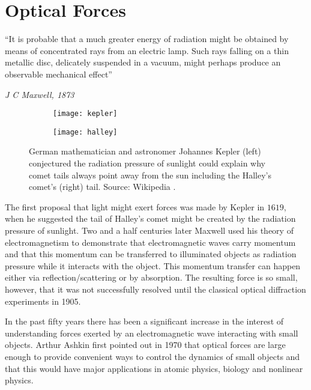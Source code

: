 \section{Optical Forces}

\setlength{\epigraphwidth}{0.8\textwidth}
\epigraph{``It is probable that a much greater energy of radiation might be obtained by means of concentrated rays from an electric lamp. Such rays falling on a thin metallic disc, delicately suspended in a vacuum, might perhaps produce an observable mechanical effect''}{\textit{J C Maxwell, 1873}}

\begin{figure}
\begin{subfigure}{.4\textwidth}
  \centering
  \texttt{[image: kepler]}
  \label{fig:kepler}
\end{subfigure}%
\begin{subfigure}{.4\textwidth}
  \centering
  \texttt{[image: halley]}
  \label{fig:halley}
\end{subfigure}
\caption{German mathematician and astronomer Johannes Kepler (left) conjectured the radiation pressure of sunlight could explain why comet tails always point away from the sun including the Halley's comet's (right) tail. Source: Wikipedia \cite{kepler_pic, halley_comet}.}
\label{fig:kepler_halley}
\end{figure}

The first proposal that light might exert forces was made by Kepler in $1619$, when he suggested the tail of Halley's comet might be created by the radiation pressure of sunlight. Two and a half centuries later Maxwell used his theory of electromagnetism to demonstrate that electromagnetic waves carry momentum and that this momentum can be transferred to illuminated objects as radiation pressure while it interacts with the object. This momentum transfer can happen either via reflection/scattering or by absorption. The resulting force is so small, however, that it was not successfully resolved until the classical optical diffraction experiments in 1905.

In the past fifty years there has been a significant increase in the interest of understanding forces exerted by an electromagnetic wave interacting with small objects. Arthur Ashkin first pointed out in 1970 that optical forces are large enough to provide convenient ways to control the dynamics of small objects and that this would have major applications in atomic physics, biology and nonlinear physics. 

